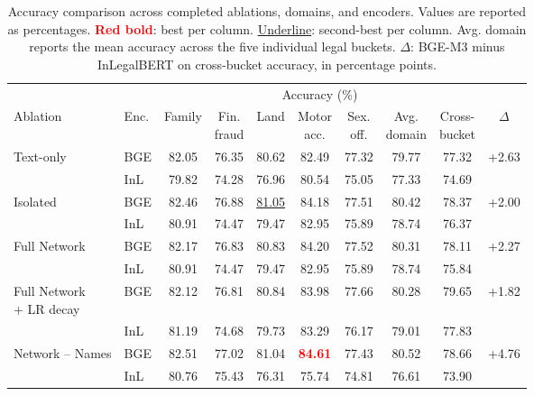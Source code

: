 \documentclass[runningheads]{llncs}
\newcommand{\best}[1]{\textbf{\textcolor{red}{#1}}}
\newcommand{\second}[1]{\underline{#1}}
\begin{document}
\begin{table}[!htbp]
\centering
\caption{Accuracy comparison across completed ablations, domains, and encoders. Values are reported as percentages. \best{Red bold}: best per column. \second{Underline}: second-best per column. Avg. domain reports the mean accuracy across the five individual legal buckets. $\Delta$: BGE-M3 minus InLegalBERT on cross-bucket accuracy, in percentage points.}
\label{tab:accuracy-comparison}
\setlength{\tabcolsep}{1.8pt}
\renewcommand{\arraystretch}{1.18}
\scriptsize
\begin{adjustbox}{max width=\textwidth}
\begin{tabular}{p{2.75cm} l ccccc>{\columncolor{gray!10}}c c c}
\toprule
 & & \multicolumn{7}{c}{Accuracy (\%)} & \\
\cmidrule(lr){3-9}
Ablation & Enc. & Family & \makecell{Fin.\\fraud} & Land & \makecell{Motor\\acc.} & \makecell{Sex.\\off.} & \makecell{Avg.\\domain} & \makecell{Cross-\\bucket} & $\Delta$ \\
\midrule

Text-only
 & BGE & 82.05 & 76.35 & 80.62 & 82.49 & 77.32 & 79.77 & 77.32 & \multirow{2}{*}{+2.63}\\
 & InL & 79.82 & 74.28 & 76.96 & 80.54 & 75.05 & 77.33 & 74.69 & \\
\midrule

Isolated
 & BGE & 82.46 & 76.88 & \second{81.05} & 84.18 & 77.51 & 80.42 & 78.37 & \multirow{2}{*}{+2.00}\\
 & InL & 80.91 & 74.47 & 79.47 & 82.95 & 75.89 & 78.74 & 76.37 & \\
\midrule

Full Network
 & BGE & 82.17 & 76.83 & 80.83 & 84.20 & 77.52 & 80.31 & 78.11 & \multirow{2}{*}{+2.27}\\
 & InL & 80.91 & 74.47 & 79.47 & 82.95 & 75.89 & 78.74 & 75.84 & \\
\midrule

\makecell[l]{Full Network\\+ LR decay}
 & BGE & 82.12 & 76.81 & 80.84 & 83.98 & 77.66 & 80.28 & 79.65 & \multirow{2}{*}{+1.82}\\
 & InL & 81.19 & 74.68 & 79.73 & 83.29 & 76.17 & 79.01 & 77.83 & \\
\midrule

Network -- Names
 & BGE & 82.51 & 77.02 & 81.04 & \best{84.61} & 77.43 & 80.52 & 78.66 & \multirow{2}{*}{+4.76}\\
 & InL & 80.76 & 75.43 & 76.31 & 75.74 & 74.81 & 76.61 & 73.90 & \\
\midrule


\end{tabular}
\end{adjustbox}
\end{table}
\end{document}
